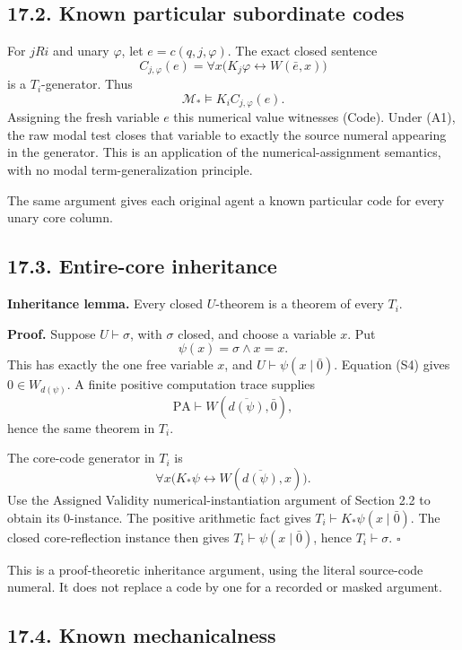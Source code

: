 \documentclass[
  11pt,
  letterpaper,
]{article}
\begin{document}
\subsection{17.2. Known particular subordinate
codes}\label{known-particular-subordinate-codes}

For \(jRi\) and unary \(\varphi\), let \(e=c(q,j,\varphi)\). The exact
closed sentence \[
C_{j,\varphi}(e)=
\forall x\bigl(K_j\varphi\leftrightarrow W(\bar e,x)\bigr)
\] is a \(T_i\)-generator. Thus \[
\mathcal M_*\models K_iC_{j,\varphi}(e).
\] Assigning the fresh variable \(e\) this numerical value witnesses
(Code). Under (A1), the raw modal test closes that variable to exactly
the source numeral appearing in the generator. This is an application of
the numerical-assignment semantics, with no modal term-generalization
principle.

The same argument gives each original agent a known particular code for
every unary core column.

\subsection{17.3. Entire-core
inheritance}\label{entire-core-inheritance}

\textbf{Inheritance lemma.} Every closed \(U\)-theorem is a theorem of
every \(T_i\).

\textbf{Proof.} Suppose \(U\vdash\sigma\), with \(\sigma\) closed, and
choose a variable \(x\). Put \[
\psi(x)=\sigma\land x=x.
\] This has exactly the one free variable \(x\), and
\(U\vdash\psi(x\mid\bar0)\). Equation (S4) gives \(0\in W_{d(\psi)}\). A
finite positive computation trace supplies \[
\mathrm{PA}\vdash W(\overline{d(\psi)},\bar0),
\] hence the same theorem in \(T_i\).

The core-code generator in \(T_i\) is \[
\forall x\bigl(K_*\psi\leftrightarrow
                   W(\overline{d(\psi)},x)\bigr).
\] Use the Assigned Validity numerical-instantiation argument of Section
2.2 to obtain its \(0\)-instance. The positive arithmetic fact gives
\(T_i\vdash K_*\psi(x\mid\bar0)\). The closed core-reflection instance
then gives \(T_i\vdash\psi(x\mid\bar0)\), hence \(T_i\vdash\sigma\).
\(\square\)

This is a proof-theoretic inheritance argument, using the literal
source-code numeral. It does not replace a code by one for a recorded or
masked argument.

\subsection{17.4. Known mechanicalness}\label{known-mechanicalness}
\end{document}
